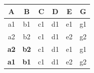 \documentclass[10pt,a4paper,answers]{exam}
\newcounter{sol}
\begin{document}
\begin{questions}
\begin{solution}
\begin{enumerate}
		\begin{center}
			\centering
			\begin{tabular}{|c|c|c|c|c|c|}
				\hline
				\rowcolor[HTML]{EFEFEF} 
				\textbf{A}               & \textbf{B}              & \textbf{C}              & \textbf{D}              & \textbf{E}              & {\color[HTML]{333333} \textbf{G}} \\ \hline
				a1                       & b1                      & c1                      & d1                      & e1                      & g1                                \\ \hline
				a2                       & b2                      & c1                      & d1                      & e2                      & g2                                \\ \hline
				\multicolumn{1}{|l|}{\textbf{a2}} & \multicolumn{1}{l|}{\textbf{b2}} & \multicolumn{1}{l|}{c1} & \multicolumn{1}{l|}{d1} & \multicolumn{1}{l|}{e1} & \multicolumn{1}{l|}{g1}           \\ \hline
				\multicolumn{1}{|l|}{\textbf{a1}} & \multicolumn{1}{l|}{\textbf{b1}} & \multicolumn{1}{l|}{c1} & \multicolumn{1}{l|}{d1} & \multicolumn{1}{l|}{e2} & \multicolumn{1}{l|}{g2}           \\ \hline
			\end{tabular}
		\end{center}
		

\end{enumerate}
\end{solution}
\end{questions}
\end{document}
